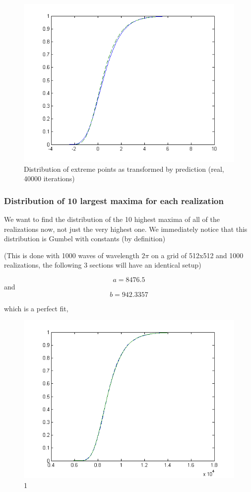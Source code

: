 \documentclass[12pt]{article}
\begin{document}
\begin{figure}[hpt]
	\centering
		\includegraphics[width=1.00\textwidth]{40000it32x32gumbRpredictive.png}
	\caption{Distribution of extreme points as transformed by prediction (real, 40000 iterations)}
	\label{fig:40000it32x32gumbRpredictive}
\end{figure}

\subsubsection{Distribution of 10 largest maxima for each realization}

We want to find the distribution of the 10 highest maxima of all of the realizations now, not just the very highest one. We immediately notice that this distribution is Gumbel with constants (by definition)

(This is done with 1000 waves of wavelength $2\pi$ on a grid of 512x512 and 1000 realizations, the following 3 sections will have an identical setup)

\[a = 8476.5\]
and
\[b = 942.3357\]

which is a perfect fit,

\begin{figure}[hpt]
	\centering
		\includegraphics[width=1.00\textwidth]{pnR_512_top10_gumbel.png}
	\caption{1}
	\label{fig:pnR_512_top10_gumbel}
\end{figure}
\end{document}
